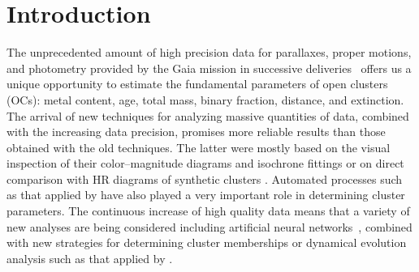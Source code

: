 \documentclass{aa}
\begin{document}

\maketitle


\section{Introduction}

 The unprecedented amount of high precision data for parallaxes, proper motions,
 and photometry provided by the Gaia mission in successive
 deliveries~\citep[DR2 and EDR3,][]{Gaia_2016,Gaia_EDR3} offers us a unique
 opportunity to estimate the fundamental parameters of open clusters (OCs): metal
 content, age, total mass, binary fraction, distance,  and extinction.
 The arrival of new techniques for analyzing massive quantities of  data, combined with the
 increasing data precision, promises more reliable results than those obtained
 with the old techniques. The latter were mostly based on the visual inspection
 of their color--magnitude diagrams and isochrone fittings \citep{Phelps1994} or
 on direct comparison with HR diagrams of synthetic clusters \citep{Siess1997}.
 Automated processes such as that applied by \cite{Kharchenko_2012} have also
 played a very important role in determining cluster parameters.
 The continuous increase of high quality data means that a variety of new
 analyses are being considered including artificial
 neural networks~\citep{Cantat_2020}, combined with new strategies for
 determining cluster memberships \citep{Krone2014,Cantat-Gaudin_2018} or
 dynamical evolution analysis such as that applied by \citep{Gregorio_2015}.
\end{document}
